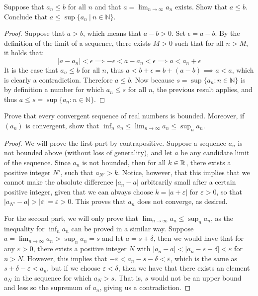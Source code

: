 \begin{exercise}{5}
    Suppose that $a_n \leq b$ for all $n$ and that $a = \lim_{n\rightarrow \infty}a_n$ exists. Show that $a \leq b$. Conclude that $a \leq \sup\{a_n~|~n \in \mathbb{N}\}$.
\end{exercise}
\begin{proof}
    Suppose that $a > b$, which means that $a - b > 0$. Set $\epsilon = a -b$. By the definition of the limit of a sequence, there exists $M > 0$ such that for all $n > M$, it holds that:
    $$\lvert a - a_n \rvert < \epsilon \implies -\epsilon < a - a_n < \epsilon \implies a < a_n + \epsilon$$
    It is the case that $a_n \leq b$ for all $n$, thus $a < b + \epsilon = b + (a -b) \implies a < a$, which is clearly a contradiction. Therefore $a \leq b$. Now because $s = \sup\{a_n : n \in \mathbb{N}\}$ is by definition a number for which $a_n \leq s$ for all $n$, the previous result applies, and thus $a \leq s = \sup\{a_n : n \in \mathbb{N}\}$.
\end{proof}

\begin{exercise}{6}
Prove that every convergent sequence of real numbers is bounded. Moreover, if $(a_n)$ is convergent, show that $\inf_na_n\leq \lim_{n\to\infty}a_n\leq\sup_na_n$.
\end{exercise}
\begin{proof}
We will prove the first part by contrapositive. Suppose a sequence $a_n$ is not bounded above (without loss of generality), and let $a$ be any candidate limit of the sequence. Since $a_n$ is not bounded, then for all $k\in\mathbb{R}$, there exists a positive integer $N'$, such that $a_{N'}>k$. Notice, however, that this implies that we cannot make the absolute difference $\lvert a_n-a\rvert$ arbitrarily small after a certain positive integer, given that we can always choose $k=\lvert a+\varepsilon\rvert$ for $\varepsilon>0$, so that $\lvert a_{N'}-a\rvert >\lvert \varepsilon\rvert= \varepsilon> 0$. This proves that $a_n$ does not converge, as desired.

For the second part, we will only prove that $\lim_{n\to\infty}a_n\leq\sup_na_n$, as the inequality for $\inf_na_n$ can be proved in a similar way. Suppose $a=\lim_{n\to\infty}a_n> \sup_na_n=s$ and let $a=s+\delta$, then we would have that for any $\varepsilon>0$, there exists a positive integer $N$ with $\lvert a_n-a\rvert <\lvert a_n-s-\delta\rvert< \varepsilon$ for $n>N$. However, this implies that $-\varepsilon< a_n-s-\delta<\varepsilon$, which is the same as $s+\delta-\varepsilon<a_n$, but if we choose $\varepsilon<\delta$, then we have that there exists an element $a_N$ in the sequence for which $a_N>s$. That is, $s$ would not be an upper bound and less so the supremum of $a_n$, giving us a contradiction.
\end{proof}


